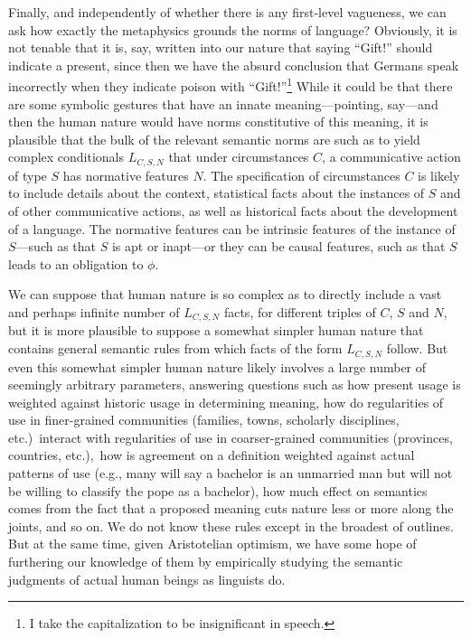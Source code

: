 Finally, and independently of whether there is any first-level vagueness, we can ask how exactly the metaphysics grounds the norms of language? 
Obviously, it is not tenable that it is, say, written into our nature that saying ``Gift!'' should indicate a present, since then we have the 
absurd conclusion that Germans speak incorrectly when they indicate poison with ``Gift!''\footnote{I take the 
capitalization to be insignificant in speech.} While it could be that there are some symbolic gestures
that have an innate meaning---pointing, say---and then the human nature would have norms constitutive of this
meaning, it is plausible that the bulk of the relevant semantic norms are such as to yield complex conditionals 
$L_{C,S,N}$ that under circumstances $C$, a communicative action of type $S$ has normative features $N$. The 
specification of 
circumstances $C$ is likely to include details about the context,
statistical facts about the instances of $S$ and of other communicative actions, as well as historical facts about 
the development of a language. The normative features can be intrinsic features of the instance of $S$---such as
that $S$ is apt or inapt---or they can be causal features, such as that $S$ leads to an obligation to $\phi$. 

We can suppose that human nature is so complex as to directly include a vast and perhaps infinite number of $L_{C,S,N}$ facts, 
for different triples of $C$, $S$ and $N$, but it is more plausible to suppose a somewhat simpler human nature that contains
general semantic rules from which facts of the form $L_{C,S,N}$ follow. But even this somewhat simpler human
nature likely involves a large number of seemingly arbitrary parameters, answering  questions such as how 
present usage is weighted against historic usage in determining meaning, how do regularities of use in finer-grained
communities (families, towns, scholarly disciplines, etc.)\ interact with regularities of use in coarser-grained 
communities (provinces, countries, etc.),\ how is agreement on a definition weighted against actual patterns of 
use (e.g., many will say a bachelor is an unmarried man but will not be willing to classify the pope as a bachelor),
how much effect on semantics comes from the fact that a proposed meaning cuts nature less or more along the joints,
and so on. We do not know these rules except in the broadest of outlines. But at the same time, given Aristotelian
optimism, we have some hope of furthering our knowledge of them by empirically studying the semantic judgments of 
actual human beings as linguists do.

